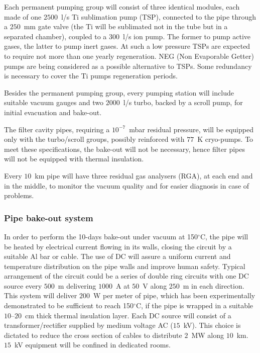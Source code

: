 Each permanent pumping group will consist of three identical modules, each made of one $2500$~l/s Ti sublimation pump (TSP), connected to the pipe through a $250$~mm gate valve (the Ti will be sublimated not in the tube but in a separated chamber), coupled to a $300$~l/s ion pump. The former to pump active gases, the latter to pump inert gases. At such a low pressure TSPs are expected to require not more than one yearly regeneration. NEG (Non Evaporable Getter) pumps are being considered as a possible alternative to TSPs. Some redundancy is necessary to cover the Ti pumps regeneration periods.

Besides the permanent pumping group, every pumping station will include suitable vacuum gauges and two $2000$~l/s turbo, backed by a scroll pump, for initial evacuation and bake-out. 

The filter cavity pipes, requiring a $10^{-7}$~mbar residual pressure, will be equipped only with the turbo/scroll groups, possibly reinforced with $77$~K cryo-pumps. To meet these specifications, the bake-out will not be necessary, hence filter pipes will not be equipped with thermal insulation.

Every $10$~km pipe will have three residual gas analysers (RGA), at each end and in the middle, to monitor the vacuum quality and for easier diagnosis in case of problems.

\subsubsection{Pipe bake-out system} 
In order to perform the 10-days bake-out under vacuum at 150$^{\circ}$C, the pipe will be heated by electrical current flowing in its walls, closing the circuit by a suitable Al bar or cable. The use of DC will assure a uniform current and temperature distribution on the pipe walls and improve human safety. Typical arrangement of the circuit could be a series of double ring circuits with one DC source every $500$~m delivering $1000$~A at $50$~V along $250$~m in each direction. This system will deliver $200$~W per meter of pipe, which has been experimentally demonstrated to be sufficient to reach 150$^{\circ}$C, if the pipe is wrapped in a suitable $10$--$20$~cm thick thermal insulation layer. Each DC source will consist of a transformer/rectifier supplied by medium voltage AC ($15$~kV). This choice is dictated to reduce the cross section of cables to distribute $2$~MW along $10$~km. $15$~kV equipment will be confined in dedicated rooms. 

